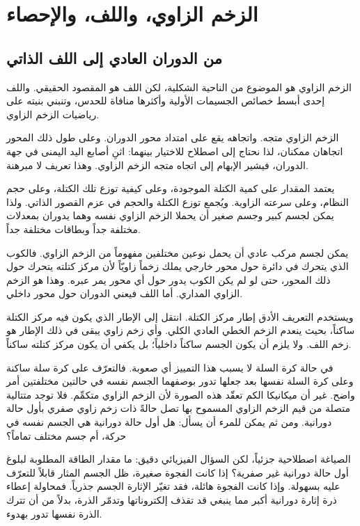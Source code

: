 \chapter{الزخم الزاوي، واللف، والإحصاء}

\section{من الدوران العادي إلى اللف الذاتي}

الزخم الزاوي هو الموضوع من الناحية الشكلية، لكن اللف هو المقصود الحقيقي. واللف إحدى أبسط خصائص الجسيمات الأولية وأكثرها منافاة للحدس، وتنبني بنيته على رياضيات الزخم الزاوي.

الزخم الزاوي متجه. واتجاهه يقع على امتداد محور الدوران. وعلى طول ذلك المحور اتجاهان ممكنان، لذا نحتاج إلى اصطلاح للاختيار بينهما: اثنِ أصابع اليد اليمنى في جهة الدوران، فيشير الإبهام إلى اتجاه متجه الزخم الزاوي. وهذا تعريف لا مبرهنة.

يعتمد المقدار على كمية الكتلة الموجودة، وعلى كيفية توزع تلك الكتلة، وعلى حجم النظام، وعلى سرعته الزاوية. ويُجمع توزع الكتلة والحجم في عزم القصور الذاتي. ولذا يمكن لجسم كبير وجسم صغير أن يحملا الزخم الزاوي نفسه وهما يدوران بمعدلات مختلفة جداً وبطاقات مختلفة جداً.

يمكن لجسم مركب عادي أن يحمل نوعين مختلفين مفهوماً من الزخم الزاوي. فالكوب الذي يتحرك في دائرة حول محور خارجي يملك زخماً زاويّاً لأن مركز كتلته يتحرك حول ذلك المحور، حتى لو لم يكن الكوب يدور حول أي محور يمر عبره. وهذا هو الزخم الزاوي المداري. أما اللف فيعني الدوران حول محور داخلي.

ويستخدم التعريف الأدق إطار مركز الكتلة. انتقل إلى الإطار الذي يكون فيه مركز الكتلة ساكناً، بحيث ينعدم الزخم الخطي العادي الكلي. وأي زخم زاوي يبقى في ذلك الإطار هو زخم اللف. ولا يلزم أن يكون الجسم ساكناً داخلياً؛ بل يكفي أن يكون مركز كتلته ساكناً.

في حالة كرة السلة لا يسبب هذا التمييز أي صعوبة. فالتعرّف على كرة سلة ساكنة وعلى كرة السلة نفسها بعد جعلها تدور بوصفهما الجسم نفسه في حالتين مختلفتين أمر واضح. غير أن ميكانيكا الكم تعقّد هذه الصورة لأن الزخم الزاوي متكمِّم. فلا توجد متتالية متصلة من قيم الزخم الزاوي المسموح بها تصل حالةً ذات زخم زاوي صفري بأول حالة دورانية. ومن ثم يمكن للمرء أن يسأل: هل أول حالة دورانية هي الجسم نفسه في حركة، أم جسم مختلف تماماً؟

الصياغة اصطلاحية جزئياً، لكن السؤال الفيزيائي دقيق: ما مقدار الطاقة المطلوبة لبلوغ أول حالة دورانية غير صفرية؟ إذا كانت الفجوة صغيرة، ظل الجسم المثار قابلاً للتعرّف عليه بسهولة. وإذا كانت الفجوة هائلة، فقد تغيّر الإثارة الجسم جذرياً. فمحاولة إعطاء ذرة إثارة دورانية أكبر مما ينبغي قد تقذف إلكتروناتها وتدمّر الذرة، بدلاً من أن تترك الذرة نفسها تدور بهدوء.

